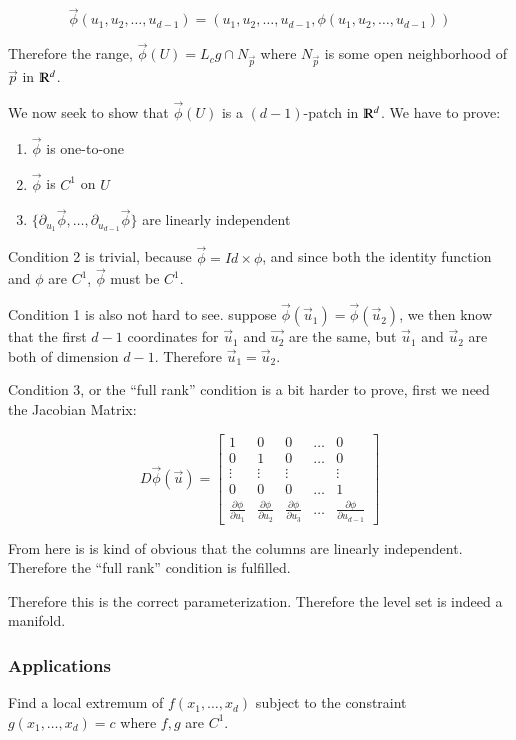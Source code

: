 \documentclass [12 pt, twoside] {book}
\newcommand\+{\text{ }}
\begin{document}
\[
    \vec{\phi}(u_1, u_2, \dots, u_{d-1}) = (u_1, u_2, \dots, u_{d - 1}, \phi(u_1,
    u_2, \dots, u_{d - 1}))
\]

Therefore the range, $\vec{\phi}(U) = L_c g \cap N_{\vec{p}}$ where
$N_{\vec{p}}$ is some open neighborhood of $\vec{p}$ in $\varmathbb{R}^d$.

We now seek to show that $\vec{\phi}(U)$ is a $(d-1)$-patch in
$\varmathbb{R}^d$. We have to prove:
\begin{enumerate}
    \item $\vec{\phi}$ is one-to-one
    \item $\vec{\phi}$ is $C^1$ on $U$
    \item $\{\partial_{u_1} \vec{\phi}, \dots, \partial_{u_{d - 1}}
        \vec{\phi}\}$ are linearly independent
\end{enumerate}

Condition 2 is trivial, because $\vec{\phi} = Id \times \phi$, and since both
the identity function and $\phi$ are $C^1$, $\vec{\phi}$ must be $C^1$.

Condition 1 is also not hard to see. suppose $\vec{\phi}(\vec{u}_1) =
\vec{\phi}(\vec{u}_2)$, we then know that the first $d-1$ coordinates for
$\vec{u}_1$ and $\vec{u_2}$ are the same, but $\vec{u}_1$ and $\vec{u}_2$ are
both of dimension $d - 1$. Therefore $\vec{u}_1 = \vec{u}_2$.

Condition 3, or the ``full rank'' condition is a bit harder to prove, first we
need the Jacobian Matrix:

\[
    D\vec{\phi}(\vec{u}) =
    \left[\begin{array}{ccccc}
        1 & 0 & 0 & \dots & 0 \\
        0 & 1 & 0 & \dots & 0 \\
        \vdots & \vdots & \vdots & & \vdots\\
        0 & 0 & 0 & \dots & 1 \\
        \frac{\partial \phi}{\partial u_1} & \frac{\partial \phi}{\partial u_2}
            & \frac{\partial \phi}{\partial u_3} & \dots &
            \frac{\partial \phi}{\partial u_{d - 1}}
    \end{array}\right]
\]

From here is is kind of obvious that the columns are linearly independent.
Therefore the ``full rank'' condition is fulfilled.

Therefore this is the correct parameterization. Therefore the level set is indeed a manifold.

\subsubsection{Applications}
Find a local extremum of $f(x_1, \dots, x_d)$ subject to the constraint $g(x_1,
\dots, x_d) = c$ where $f, g$ are $C^1$.
\end{document}
